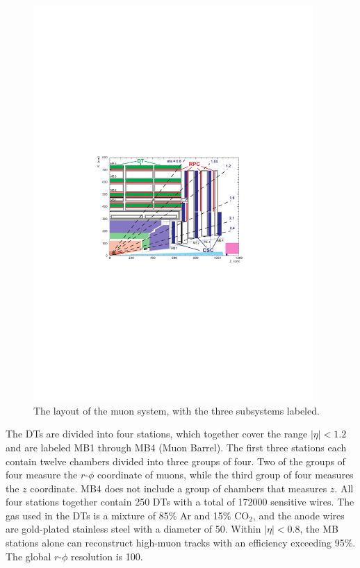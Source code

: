 \begin{figure}[hbt]
\begin{center}
\includegraphics[width=0.95\textwidth]{figures/CMS_muon_system.pdf}
\caption{The layout of the muon system, with the three subsystems labeled.}
\label{fig:muon-system}
\end{center}
\end{figure}

The DTs are divided into four stations, which together cover the range $|\eta|<1.2$ and are labeled MB1 through MB4 (Muon Barrel). The first three stations each contain twelve chambers divided into three groups of four. Two of the groups of four measure the $r$-$\phi$ coordinate of muons, while the third group of four measures the $z$ coordinate. MB4 does not include a group of chambers that measures $z$. All four stations together contain 250 DTs with a total of 172000 sensitive wires. The gas used in the DTs is a mixture of 85\% Ar and 15\% $\text{CO}_2$, and the anode wires are gold-plated stainless steel with a diameter of 50\mum. Within $|\eta|<0.8$, the MB stations alone can reconstruct high-\pt muon tracks with an efficiency exceeding 95\%. The global $r$-$\phi$ resolution is 100\mum.

